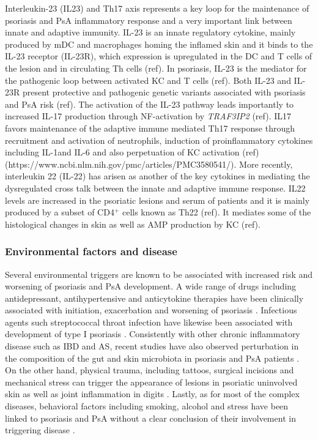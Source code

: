 Interleukin-23 (IL23) and Th17 axis represents a key loop for the maintenance of psoriasis and PsA inflammatory response and a very important link between innate and adaptive immunity. IL-23 is an innate regulatory cytokine, mainly produced by mDC and macrophages homing the inflamed skin and it binds to the IL-23 receptor (IL-23R), which expression is upregulated in the DC and T cells of the lesion and in circulating Th cells (ref). In psoriasis, IL-23 is the mediator for the pathogenic loop between activated KC and T cells (ref). Both IL-23 and IL-23R present protective and pathogenic genetic variants associated with psoriasis and PsA risk (ref). The activation of the IL-23 pathway leads importantly to increased IL-17 production through NF-\kappaB activation by \textit{TRAF3IP2} (ref). IL17 favors maintenance of the adaptive immune mediated Th17 response through recruitment and activation of neutrophils, induction of proinflammatory cytokines including IL-1\beta and IL-6 and also perpetuation of KC activation (ref) (https://www.ncbi.nlm.nih.gov/pmc/articles/PMC3580541/). %
More recently, interleukin 22 (IL-22) has arisen as another of the key cytokines in mediating the dysregulated cross talk between the innate and adaptive immune response. IL22 levels are increased in the psoriatic lesions and serum of patients and it is mainly produced by a subset of CD4$^+$ cells known as Th22 (ref). It mediates some of the histological changes in skin as well as AMP production by KC (ref).


\subsubsection*{Environmental factors and disease}

Several environmental triggers are known to be associated with increased risk and worsening of psoriasis and PsA development. A wide range of drugs including antidepressant, antihypertensive and anticytokine therapies have been clinically associated with initiation, exacerbation and worsening of psoriasis \parencite{Kim2010}. Infectious agents such streptococcal throat infection have likewise been associated with development of type I psoriasis \parencite{Gudjonsson2003,Valdimarsson2009, Diluvio2006}. Consistently with other chronic inflammatory disease such as IBD and AS, recent studies have also observed perturbation in the composition of the gut and skin microbiota in psoriasis and PsA patients \parencite{Eppinga2014}. On the other hand, physical trauma, including tattoos, surgical incisions and mechanical stress can trigger the appearance of lesions in psoriatic uninvolved skin as well as joint inflammation in digits \parencite {Weiss2002,Nestle2009}. Lastly, as for most of the complex diseases, behavioral factors including smoking, alcohol and stress have been linked to psoriasis and PsA without a clear conclusion of their involvement in triggering disease \parencite{Meglio2014}.


